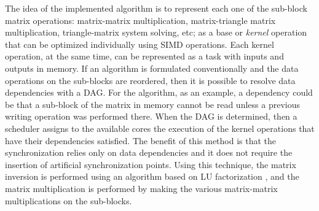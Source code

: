 The idea of the implemented algorithm is to represent each one of the
sub-block matrix operations: matrix-matrix multiplication,
matrix-triangle matrix multiplication, triangle-matrix system solving,
etc; as a base or \textit{kernel} operation that can be optimized
individually using \ac{SIMD} operations. Each kernel operation, at the
same time, can be represented as a task with inputs and outputs in memory.
If an algorithm is formulated conventionally and the data operations on the
sub-blocks are reordered, then it is possible to resolve data
dependencies with a \ac{DAG}. For the algorithm, as an example, a dependency
could be that a sub-block of the matrix in memory cannot be read unless
a previous writing operation was performed there. When the
\ac{DAG} is determined, then a scheduler assigns to the available cores the
execution of the kernel operations that have their dependencies satisfied.
The benefit of this method is that the synchronization relies only on
data dependencies and it does not require the insertion of artificial
synchronization points. Using this technique, the matrix inversion is
performed using an algorithm based on LU factorization
\cite{Dongarra:2011:HPM:2132876.2132885}, and the matrix multiplication is
performed by making the various matrix-matrix multiplications on the
sub-blocks.